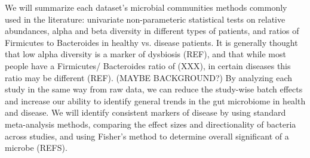 \documentclass[12pt]{article}
\begin{document}
We will summarize each dataset's microbial communities
methods commonly used in the 
literature: univariate non-parameteric statistical tests on relative 
abundances, alpha and beta diversity in different types of patients, 
and ratios of Firmicutes to Bacteroides in healthy vs. disease 
patients. It is generally thought that low alpha diversity is a marker 
of dysbiosis (REF), and that while most people have a Firmicutes/
Bacteroides ratio of (XXX), in certain diseases this ratio may be 
different (REF). (MAYBE BACKGROUND?) By analyzing each study in the 
same way from raw data, we can reduce the study-wise batch effects and 
increase our ability to identify general trends in the gut microbiome 
in health and disease. We will identify consistent markers of disease 
by using standard meta-analysis methods, comparing the effect sizes 
and directionality of bacteria across studies, and using Fisher's 
method to determine overall significant of a microbe (REFS). 



\end{document}

